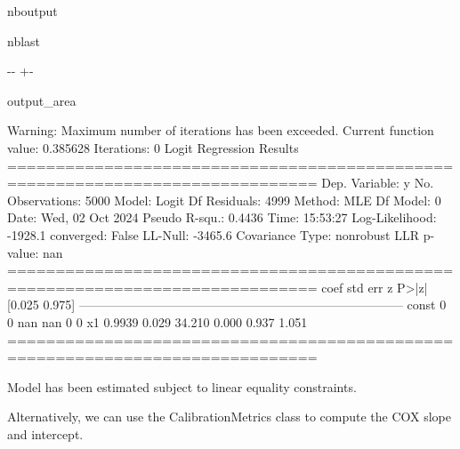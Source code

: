 \documentclass[letterpaper,10pt,english]{sphinxmanual}
\begin{document}
\begin{sphinxuseclass}{nboutput}
\begin{sphinxuseclass}{nblast}
{

\kern-\sphinxverbatimsmallskipamount\kern-\baselineskip
\kern+\FrameHeightAdjust\kern-\fboxrule
\vspace{\nbsphinxcodecellspacing}

\begin{sphinxuseclass}{output_area}
\begin{sphinxuseclass}{}


\begin{sphinxVerbatim}[commandchars=\\\{\}]
Warning: Maximum number of iterations has been exceeded.
         Current function value: 0.385628
         Iterations: 0
                           Logit Regression Results
==============================================================================
Dep. Variable:                      y   No. Observations:                 5000
Model:                          Logit   Df Residuals:                     4999
Method:                           MLE   Df Model:                            0
Date:                Wed, 02 Oct 2024   Pseudo R-squ.:                  0.4436
Time:                        15:53:27   Log-Likelihood:                -1928.1
converged:                      False   LL-Null:                       -3465.6
Covariance Type:            nonrobust   LLR p-value:                       nan
==============================================================================
                 coef    std err          z      P>|z|      [0.025      0.975]
------------------------------------------------------------------------------
const               0          0        nan        nan           0           0
x1             0.9939      0.029     34.210      0.000       0.937       1.051
==============================================================================

Model has been estimated subject to linear equality constraints.
\end{sphinxVerbatim}



\end{sphinxuseclass}
\end{sphinxuseclass}
}

\end{sphinxuseclass}
\end{sphinxuseclass}
\sphinxAtStartPar
Alternatively, we can use the CalibrationMetrics class to compute the COX slope and intercept.
\end{document}
